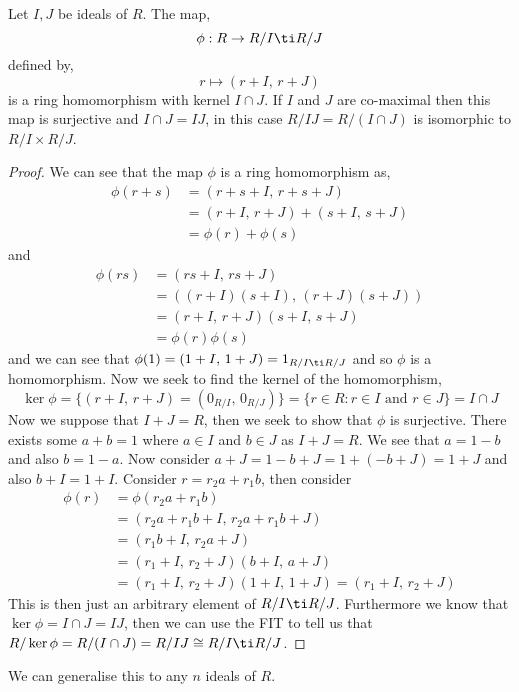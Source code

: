 \begin{nthm}
  Let $I, J$ be ideals of $R$. The map,
  $$ \phi : R \to R/I \ti R/J $$
  defined by,
  $$ r \mapsto (r + I,\, r + J) $$
  is a ring homomorphism with kernel $I \cap J$. If $I$ and $J$ are co-maximal then this map is surjective and
  $I \cap J = IJ$, in this case $R/IJ = R/(I \cap J)$ is isomorphic to $R/I \times R/J$.
\end{nthm}
\begin{proof}
  We can see that the map $\phi$ is a ring homomorphism as,
  \begin{align*}
    \phi(r + s) &= (r + s + I,\, r + s + J)\\
    &= (r + I,\, r + J) + (s + I,\, s + J) \\
    &= \phi(r) + \phi(s)
  \end{align*}
  and
  \begin{align*}
    \phi(rs) &= (rs + I,\, rs + J)\\
    &= ((r + I)(s + I),\, (r + J)(s + J))\\
    &= (r + I,\,r + J)(s + I,\, s + J)\\
    &= \phi(r)\phi(s)
  \end{align*}
  and we can see that $\phi(1) = (1 + I,\, 1 + J) = 1_{R/I\ti R/J}$ and so $\phi$ is a homomorphism. Now we seek to find the kernel of the homomorphism,
  $$ \ker \phi = \{(r + I,\, r + J) = (0_{R/I},\, 0_{R/J})\} = \{r \in R : r \in I \text{ and } r \in J\} = I \cap J $$
  Now we suppose that $I + J = R$, then we seek to show that $\phi$ is surjective.
  There exists some $a + b = 1$ where $a \in I$ and $b \in J$ as $I + J = R$. We see that $a = 1 - b$ and also $b = 1 - a$. Now consider $a + J = 1 - b + J = 1 + (-b + J) = 1 + J$ and also $b + I = 1 + I$. Consider $r = r_2a + r_1b$, then consider
  \begin{align*}
    \phi(r) &= \phi(r_2a + r_1b)\\
    &= (r_2a + r_1b + I,\, r_2a + r_1b + J)\\
    &= (r_1b + I,\, r_2a + J)\\
    &= (r_1 + I,\, r_2 + J)(b + I,\, a + J)\\
    &= (r_1 + I,\, r_2 + J)(1 + I,\, 1 + J) = (r_1 + I,\, r_2 + J)
  \end{align*}
  This is then just an arbitrary element of $R/I \ti R/J$. Furthermore we know that $\ker \phi = I\cap J = IJ$, then we can use the FIT to tell us that $R/\ker\phi = R/(I \cap J) = R/IJ \cong R/I \ti R/J$.
\end{proof}

\noindent
We can generalise this to any $n$ ideals of $R$.